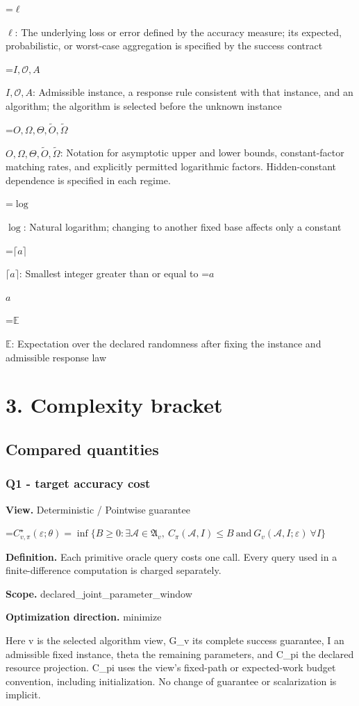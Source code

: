 \documentclass[10pt,a4paper]{article}
\newcommand{\AtlasMath}[1]{\par\begingroup\centering\setbox0=\hbox{$\displaystyle #1$}\ifdim\wd0>1.4\linewidth\typeout{ATLAS WIDE FORMULA: \the\wd0}\fi\ifdim\wd0>\linewidth\resizebox{\linewidth}{!}{\box0}\else\box0\fi\par\endgroup}
\newcommand{\AtlasInlineMath}[1]{\begingroup\setbox0=\hbox{$#1$}\ifdim\wd0>.4\linewidth\endgroup\AtlasMath{#1}\else\endgroup$#1$\fi}
\begin{document}
\AtlasInlineMath{\ell}: The underlying loss or error defined by the accuracy measure; its expected, probabilistic, or worst-case aggregation is specified by the success contract

\AtlasInlineMath{I,\mathcal{O},A}: Admissible instance, a response rule consistent with that instance, and an algorithm; the algorithm is selected before the unknown instance

\AtlasInlineMath{O,\Omega,\Theta,\widetilde{O},\widetilde\Omega}: Notation for asymptotic upper and lower bounds, constant-factor matching rates, and explicitly permitted logarithmic factors. Hidden-constant dependence is specified in each regime.

\AtlasInlineMath{\log}: Natural logarithm; changing to another fixed base affects only a constant

\AtlasInlineMath{\lceil a\rceil}: Smallest integer greater than or equal to \AtlasInlineMath{a}

\AtlasInlineMath{\mathbb{E}}: Expectation over the declared randomness after fixing the instance and admissible response law

\section{3. Complexity bracket}
\subsection{Compared quantities}
\subsubsection{Q1 - target accuracy cost}
\textbf{View.} Deterministic / Pointwise guarantee

\AtlasMath{C^\star_{v,\pi}(\varepsilon;\theta)=\inf\{B\ge0:\exists\mathcal A\in\mathfrak A_v,\ C_\pi(\mathcal A,I)\le B\ \text{and}\ G_v(\mathcal A,I;\varepsilon)\ \forall I\}}
\textbf{Definition.} Each primitive oracle query costs one call. Every query used in a finite-difference computation is charged separately.

\textbf{Scope.} declared\_joint\_parameter\_window

\textbf{Optimization direction.} minimize

Here v is the selected algorithm view, G\_v its complete success guarantee, I an admissible fixed instance, theta the remaining parameters, and C\_pi the declared resource projection. C\_pi uses the view's fixed-path or expected-work budget convention, including initialization. No change of guarantee or scalarization is implicit.
\end{document}
